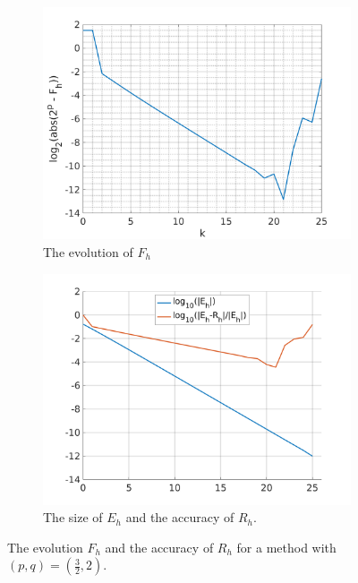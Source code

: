 \documentclass[runningheads]{llncs}
\begin{document}
\begin{figure}
\begin{subfigure}[h]{0.49\linewidth}
\includegraphics[width=\linewidth]{rint_mwe2a.png}
\caption{The evolution of $F_h$} \label{fig:rint_mwe2a}
\end{subfigure}
\hfill
\begin{subfigure}[h]{0.49\linewidth}
\includegraphics[width=\linewidth]{rint_mwe2b.png}
\caption{The size of $E_h$ and the accuracy of $R_h$.} \label{fig:rint_mwe2b}
\end{subfigure}%
\caption{The evolution $F_h$ and the accuracy of $R_h$ for a method with $(p,q) = (\frac{3}{2},2)$.}
\end{figure}
\end{document}
